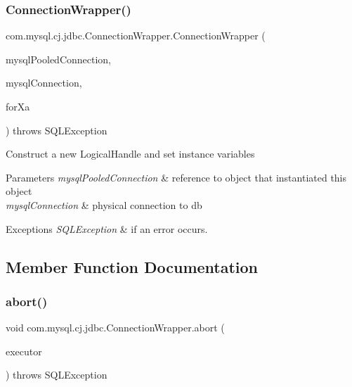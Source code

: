 \subsubsection{\texorpdfstring{Connection\+Wrapper()}{ConnectionWrapper()}}
{\footnotesize\ttfamily com.\+mysql.\+cj.\+jdbc.\+Connection\+Wrapper.\+Connection\+Wrapper (\begin{DoxyParamCaption}\item[{\mbox{\hyperlink{classcom_1_1mysql_1_1cj_1_1jdbc_1_1_mysql_pooled_connection}{Mysql\+Pooled\+Connection}}}]{mysql\+Pooled\+Connection,  }\item[{\mbox{\hyperlink{interfacecom_1_1mysql_1_1cj_1_1jdbc_1_1_jdbc_connection}{Jdbc\+Connection}}}]{mysql\+Connection,  }\item[{boolean}]{for\+Xa }\end{DoxyParamCaption}) throws S\+Q\+L\+Exception}

Construct a new Logical\+Handle and set instance variables


\begin{DoxyParams}{Parameters}
{\em mysql\+Pooled\+Connection} & reference to object that instantiated this object \\
\hline
{\em mysql\+Connection} & physical connection to db\\
\hline
\end{DoxyParams}

\begin{DoxyExceptions}{Exceptions}
{\em S\+Q\+L\+Exception} & if an error occurs. \\
\hline
\end{DoxyExceptions}


\subsection{Member Function Documentation}
\mbox{\label{classcom_1_1mysql_1_1cj_1_1jdbc_1_1_connection_wrapper_a9347799039ddf573af01f07409b17d5f}} 
\subsubsection{\texorpdfstring{abort()}{abort()}}
{\footnotesize\ttfamily void com.\+mysql.\+cj.\+jdbc.\+Connection\+Wrapper.\+abort (\begin{DoxyParamCaption}\item[{Executor}]{executor }\end{DoxyParamCaption}) throws S\+Q\+L\+Exception}

